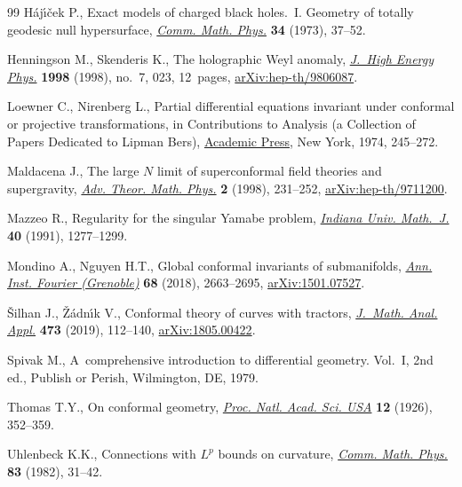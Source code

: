 \documentclass[10pt,a4paper]{article}
\numberwithin{equation}{section}
\renewcommand{\=}{\stackrel \Lambda =}
\begin{document}
\begin{thebibliography}{99}
H\'aj\'{\i}\v{c}ek P., Exact models of charged black holes.~{I}. {G}eometry of
 totally geodesic null hypersurface, \href{https://doi.org/10.1007/BF01646541}{\textit{Comm. Math. Phys.}} \textbf{34}
 (1973), 37--52.

Henningson M., Skenderis K., The holographic {W}eyl anomaly, \href{https://doi.org/10.1088/1126-6708/1998/07/023}{\textit{J.~High
 Energy Phys.}} \textbf{1998} (1998), no.~7, 023, 12~pages,
 \href{https://arxiv.org/abs/hep-th/9806087}{arXiv:hep-th/9806087}.

Loewner C., Nirenberg L., Partial differential equations invariant under
 conformal or projective transformations, in Contributions to Analysis (a
 Collection of Papers Dedicated to {L}ipman {B}ers), \href{https://doi.org/10.1016/B978-0-12-044850-0.50027-7}{Academic Press}, New York,
 1974, 245--272.

Maldacena J., The large {$N$} limit of superconformal field theories and
 supergravity, \href{https://doi.org/10.4310/ATMP.1998.v2.n2.a1}{\textit{Adv. Theor. Math. Phys.}} \textbf{2} (1998), 231--252,
 \href{https://arxiv.org/abs/hep-th/9711200}{arXiv:hep-th/9711200}.

Mazzeo R., Regularity for the singular {Y}amabe problem, \href{https://doi.org/10.1512/iumj.1991.40.40057}{\textit{Indiana Univ.
 Math.~J.}} \textbf{40} (1991), 1277--1299.

Mondino A., Nguyen H.T., Global conformal invariants of submanifolds,
 \href{https://doi.org/10.5802/aif.3220}{\textit{Ann. Inst. Fourier (Grenoble)}} \textbf{68} (2018), 2663--2695,
 \href{https://arxiv.org/abs/1501.07527}{arXiv:1501.07527}.

{\v{S}}ilhan J., {\v{Z}}\'adn\'{\i}k V., Conformal theory of curves with
 tractors, \href{https://doi.org/10.1016/j.jmaa.2018.12.038}{\textit{J.~Math. Anal. Appl.}} \textbf{473} (2019), 112--140,
 \href{https://arxiv.org/abs/1805.00422}{arXiv:1805.00422}.

Spivak M., A~comprehensive introduction to differential geometry. {V}ol.~{I},
 2nd ed., Publish or Perish, Wilmington, DE, 1979.

Thomas T.Y., On conformal geometry, \href{https://doi.org/10.1073/pnas.12.5.352}{\textit{Proc. Natl. Acad. Sci. USA}}
 \textbf{12} (1926), 352--359.

Uhlenbeck K.K., Connections with {$L^{p}$} bounds on curvature, \href{https://doi.org/10.1007/BF01947069}{ \textit{Comm.
 Math. Phys.}} \textbf{83} (1982), 31--42.


\end{thebibliography}
\end{document}

